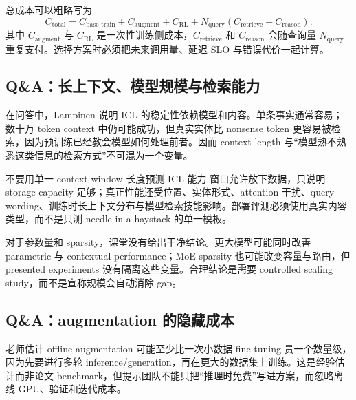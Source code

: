 \documentclass[a4paper]{article}
\begin{document}
总成本可以粗略写为
$$
C_{\text{total}}=
C_{\text{base-train}}+C_{\text{augment}}+C_{\text{RL}}
+N_{\text{query}}\left(C_{\text{retrieve}}+C_{\text{reason}}\right).
$$
其中 $C_{\text{augment}}$ 与 $C_{\text{RL}}$ 是一次性训练侧成本，$C_{\text{retrieve}}$ 和 $C_{\text{reason}}$ 会随查询量 $N_{\text{query}}$ 重复支付。选择方案时必须把未来调用量、延迟 SLO 与错误代价一起计算。

\subsection{Q\&A：长上下文、模型规模与检索能力}

在问答中，Lampinen 说明 ICL 的稳定性依赖模型和内容。单条事实通常容易；数十万 token context 中仍可能成功，但真实实体比 nonsense token 更容易被检索，因为预训练已经教会模型如何处理前者。因而 context length 与“模型熟不熟悉这类信息的检索方式”不可混为一个变量。


\begin{warningbox}{不要用单一 context-window 长度预测 ICL 能力}
窗口允许放下数据，只说明 storage capacity 足够；真正性能还受位置、实体形式、attention 干扰、query wording、训练时长上下文分布与模型检索技能影响。部署评测必须使用真实内容类型，而不是只测 needle-in-a-haystack 的单一模板。
\end{warningbox}

对于参数量和 sparsity，课堂没有给出干净结论。更大模型可能同时改善 parametric 与 contextual performance；MoE sparsity 也可能改变容量与路由，但 presented experiments 没有隔离这些变量。合理结论是需要 controlled scaling study，而不是宣称规模会自动消除 gap。

\subsection{Q\&A：augmentation 的隐藏成本}

老师估计 offline augmentation 可能至少比一次小数据 fine-tuning 贵一个数量级，因为先要进行多轮 inference/generation，再在更大的数据集上训练。这是经验估计而非论文 benchmark，但提示团队不能只把“推理时免费”写进方案，而忽略离线 GPU、验证和迭代成本。

\end{document}
